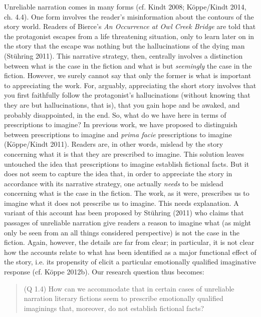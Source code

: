 Unreliable narration comes in many forms (cf. Kindt 2008; K\"oppe/Kindt
2014, ch. 4.4). One form involves the reader's misinformation about the
contours of the story world. Readers of Bierce's \emph{An Occurrence at
Owl Creek Bridge} are told that the protagonist escapes from a life
threatening situation, only to learn later on in the story that the
escape was nothing but the hallucinations of the dying man (St\"uhring
2011). This narrative strategy, then, centrally involves a distinction
between what is the case in the fiction and what is but \emph{seemingly}
the case in the fiction. However, we surely cannot say that only the
former is what is important to appreciating the work. For, arguably,
appreciating the short story involves that you first faithfully follow
the protagonist's hallucinations (without knowing that they are but
hallucinations, that is), that you gain hope and be awaked, and probably
disappointed, in the end. So, what do we have here in terms of
prescriptions to imagine? In previous work, we have proposed to
distinguish between prescriptions to imagine and \emph{prima facie}
prescriptions to imagine (K\"oppe/Kindt 2011). Readers are, in other
words, mislead by the story concerning what it is that they are
prescribed to imagine. This solution leaves untouched the idea that
prescriptions to imagine establish fictional facts. But it does not seem
to capture the idea that, in order to appreciate the story in accordance
with its narrative strategy, one actually \emph{needs} to be mislead
concerning what is the case in the fiction. The work, as it were,
prescribes us to imagine what it does not prescribe us to imagine. This
needs explanation. A variant of this account has been proposed by
St\"uhring (2011) who claims that passages of unreliable narration give
readers a reason to imagine what (as might only be seen from an all
things considered perspective) is not the case in the fiction. Again,
however, the details are far from clear; in particular, it is not clear
how the accounts relate to what has been identified as a major
functional effect of the story, i.e. its propensity of elicit a
particular emotionally qualified imaginative response (cf. K\"oppe 2012b).
Our research question thus becomes:

\vspace{-.2cm}
\begin{quote}
(Q 1.4)  How can we accommodate that in certain cases of unreliable
narration literary fictions seem  to prescribe emotionally qualified
imaginings that, moreover, do not establish fictional facts?
\end{quote}
\vspace{-.2cm}

